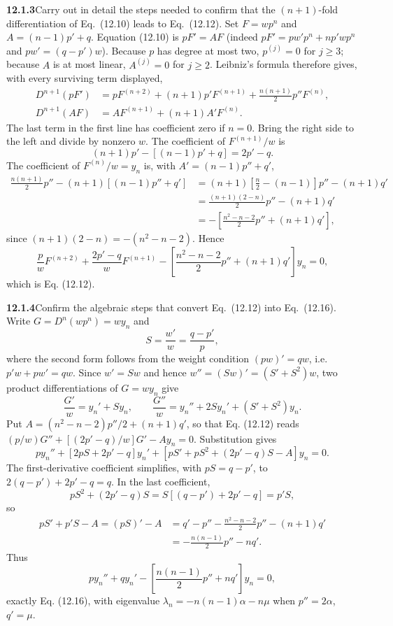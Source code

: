 \par\bigskip
\noindent\textbf{12.1.3}\quad Carry out in detail the steps needed to confirm
that the $(n+1)$-fold differentiation of Eq.~(12.10) leads to Eq.~(12.12).
\solution
Set $F=wp^n$ and $A=(n-1)p'+q$. Equation (12.10) is $pF'=AF$
(indeed $pF'=pw'p^n+np'wp^n$ and $pw'=(q-p')w$).
Because $p$ has degree at most two, $p^{(j)}=0$ for $j\ge3$; because
$A$ is at most linear, $A^{(j)}=0$ for $j\ge2$. Leibniz's formula
therefore gives, with every surviving term displayed,
\begin{align*}
D^{n+1}(pF')
 &=pF^{(n+2)}+(n+1)p'F^{(n+1)}
      +\frac{n(n+1)}2p''F^{(n)},\\
D^{n+1}(AF)
 &=AF^{(n+1)}+(n+1)A'F^{(n)}.
\end{align*}
The last term in the first line has coefficient zero if $n=0$.
Bring the right side to the left and divide by nonzero $w$.
The coefficient of $F^{(n+1)}/w$ is
\[
(n+1)p'-[(n-1)p'+q]=2p'-q.
\]
The coefficient of $F^{(n)}/w=y_n$ is, with $A'=(n-1)p''+q'$,
\begin{align*}
\frac{n(n+1)}2p''-(n+1)[(n-1)p''+q']
&=(n+1)\left[\frac n2-(n-1)\right]p''-(n+1)q'\\
&=\frac{(n+1)(2-n)}2p''-(n+1)q'\\
&=-\left[\frac{n^2-n-2}{2}p''+(n+1)q'\right],
\end{align*}
since $(n+1)(2-n)=-(n^2-n-2)$.
Hence
\[
\boxed{\frac p wF^{(n+2)}+\frac{2p'-q}{w}F^{(n+1)}
-\left[\frac{n^2-n-2}{2}p''+(n+1)q'\right]y_n=0},
\]
which is Eq. (12.12).

\par\bigskip
\noindent\textbf{12.1.4}\quad Confirm the algebraic steps that convert
Eq.~(12.12) into Eq.~(12.16).
\solution
Write $G=D^n(wp^n)=wy_n$ and
\[
S=\frac{w'}w=\frac{q-p'}p,
\]
where the second form follows from the weight condition $(pw)'=qw$,
i.e.\ $p'w+pw'=qw$. Since $w'=Sw$ and hence $w''=(Sw)'=(S'+S^2)w$, two product
differentiations of $G=wy_n$ give
\[
\frac{G'}w=y_n'+Sy_n,\qquad
\frac{G''}w=y_n''+2Sy_n'+(S'+S^2)y_n.
\]
Put $A=(n^2-n-2)p''/2+(n+1)q'$, so that Eq. (12.12) reads
$(p/w)G''+[(2p'-q)/w]G'-Ay_n=0$. Substitution gives
\[
p y_n''+[2pS+2p'-q]y_n'
+[pS'+pS^2+(2p'-q)S-A]y_n=0.
\]
The first-derivative coefficient simplifies, with $pS=q-p'$, to
$2(q-p')+2p'-q=q$. In the last coefficient,
\[
pS^2+(2p'-q)S=S[(q-p')+2p'-q]=p'S,
\]
so
\begin{align*}
pS'+p'S-A=(pS)'-A
&=q'-p''-\frac{n^2-n-2}2p''-(n+1)q'\\
&=-\frac{n(n-1)}2p''-nq'.
\end{align*}
Thus
\[
\boxed{p y_n''+q y_n'-\left[\frac{n(n-1)}2p''+nq'\right]y_n=0},
\]
exactly Eq. (12.16), with eigenvalue
$\lambda_n=-n(n-1)\alpha-n\mu$ when $p''=2\alpha$, $q'=\mu$.


